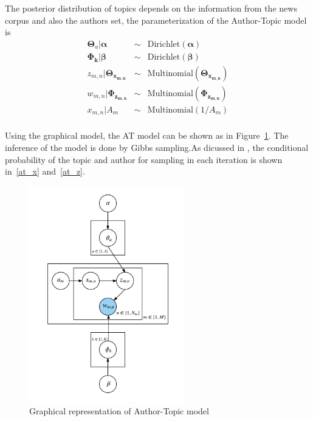{The posterior distribution of topics depends on the information from the news corpus and also the authors set, the parameterization of the Author-Topic model is 
\begin{eqnarray*} \label{eq:at}
\boldsymbol{\Theta}_a | \boldsymbol{\alpha} & \sim & \text{Dirichlet}(\boldsymbol{\alpha})\\
\boldsymbol{\Phi_{k}} | \boldsymbol{\beta} & \sim & \text{Dirichlet}(\boldsymbol{\beta})\\
z_{m,n} | \boldsymbol{\Theta_{x_{m,n}}} & \sim & \text{Multinomial}(\boldsymbol{\Theta_{x_{m,n}}})\\
w_{m,n} | \boldsymbol{\Phi_{z_{m,n}}} & \sim & \text{Multinomial}(\boldsymbol{\Phi_{z_{m,n}}})\\
x_{m,n} | A_m & \sim & \text{Multinomial}(1/A_m)\\

\end{eqnarray*}

Using the graphical model, the AT model can be shown as in Figure~\ref{fig:at}. The inference of the model is done by Gibbs sampling.As dicussed in \cite{rosen2010learning}, the conditional probability of the topic and author for sampling in each iteration is shown in~\eqref{at_x} and~\eqref{at_z}.
\begin{figure}[h]
\centering
\includegraphics[width=0.6\textwidth]{figures/AT.png}
\caption{Graphical representation of Author-Topic model}
\label{fig:at}
\end{figure}

}
